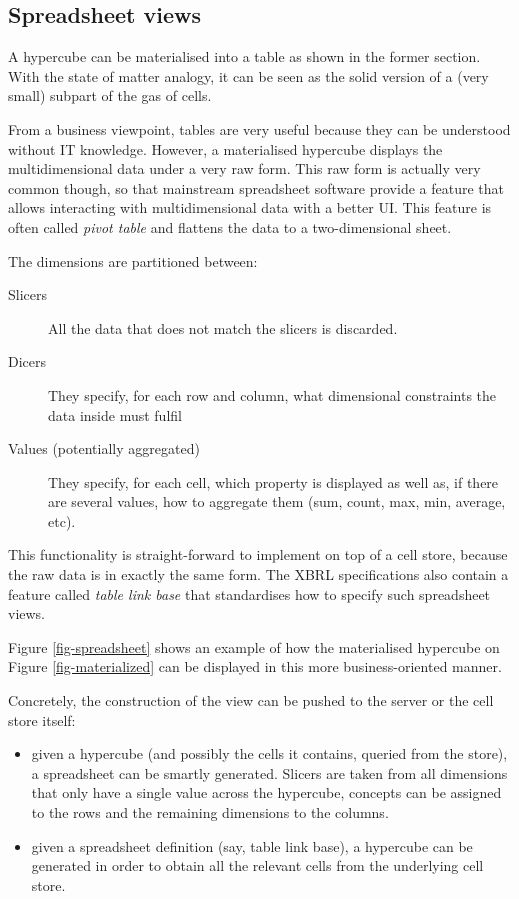 \documentclass{acm_proc_article-sp}
\begin{document}
\subsection{Spreadsheet views}

A hypercube can be materialised into a table as shown in the former section. With the state of matter analogy, it can be seen as the solid version of a (very small) subpart of the gas of cells.

From a business viewpoint, tables are very useful because they can be understood without IT knowledge. However, a materialised hypercube displays the multidimensional data under a very raw form. This raw form is actually very common though, so that mainstream spreadsheet software provide a feature that allows interacting with multidimensional data with a better UI. This feature is often called \emph{pivot table} and flattens the data to a two-dimensional sheet.

The dimensions are partitioned between:
\begin{description}
\item [Slicers] All the data that does not match the slicers is discarded.
\item [Dicers] They specify, for each row and column, what dimensional constraints the data inside must fulfil
\item [Values (potentially aggregated)] They specify, for each cell, which property is displayed as well as, if there are several values, how to aggregate them (sum, count, max, min, average, etc).
\end{description}

This functionality is straight-forward to implement on top of a cell store, because the raw data is in exactly the same form. The XBRL specifications also contain a feature called \emph{table link base} that standardises how to specify such spreadsheet views.

Figure \ref{fig-spreadsheet} shows an example of how the materialised hypercube on Figure \ref{fig-materialized} can be displayed in this more business-oriented manner.

Concretely, the construction of the view can be pushed to the server or the cell store itself:

\begin{itemize}
\item given a hypercube (and possibly the cells it contains, queried from the store), a spreadsheet can be smartly generated. Slicers are taken from all dimensions that only have a single value across the hypercube, concepts can be assigned to the rows and the remaining dimensions to the columns.
\item given a spreadsheet definition (say, table link base), a hypercube can be generated in order to obtain all the relevant cells from the underlying cell store.
\end{itemize}
\end{document}
